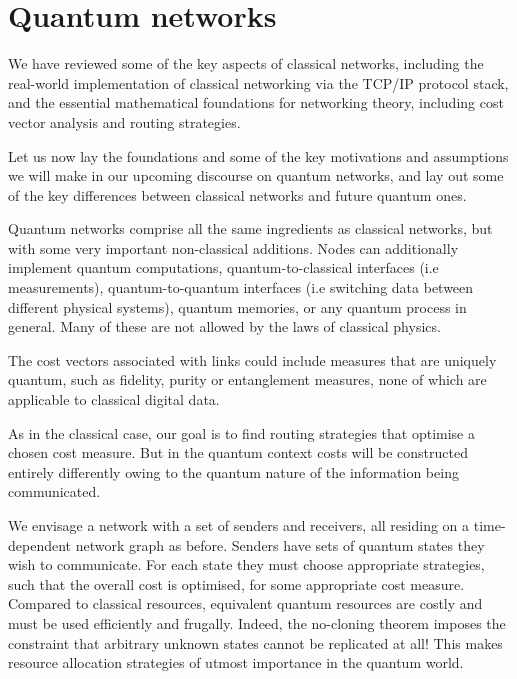 %
%

\section{Quantum networks} \label{sec:quant_net} 

We have reviewed some of the key aspects of classical networks, including the real-world implementation of classical networking via the TCP/IP protocol stack, and the essential mathematical foundations for networking theory, including cost vector analysis and routing strategies.

Let us now lay the foundations and some of the key motivations and assumptions we will make in our upcoming discourse on quantum networks, and lay out some of the key differences between classical networks and future quantum ones.

Quantum networks comprise all the same ingredients as classical networks, but with some very important non-classical additions. Nodes can additionally implement quantum computations, quantum-to-classical interfaces (i.e measurements), quantum-to-quantum interfaces (i.e switching data between different physical systems), quantum memories, or any quantum process in general. Many of these are not allowed by the laws of classical physics.

The cost vectors associated with links could include measures that are uniquely quantum, such as fidelity, purity or entanglement measures, none of which are applicable to classical digital data.

As in the classical case, our goal is to find routing strategies that optimise a chosen cost measure. But in the quantum context costs will be constructed entirely differently owing to the quantum nature of the information being communicated.

We envisage a network with a set of senders and receivers, all residing on a time-dependent network graph as before. Senders have sets of quantum states they wish to communicate. For each state they must choose appropriate strategies, such that the overall cost is optimised, for some appropriate cost measure. Compared to classical resources, equivalent quantum resources are costly and must be used efficiently and frugally. Indeed, the no-cloning theorem imposes the constraint that arbitrary unknown states cannot be replicated at all! This makes resource allocation strategies of utmost importance in the quantum world.

